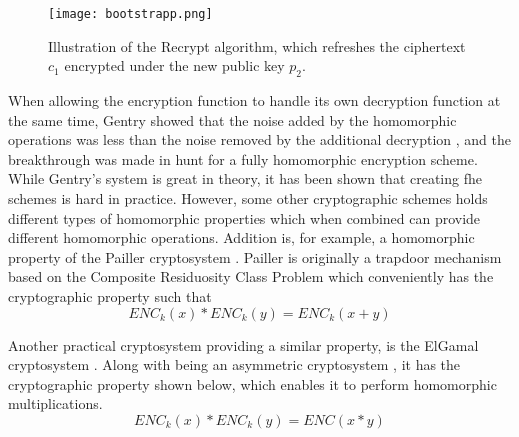 \begin{figure}[h]
	\centering
	\texttt{[image: bootstrapp.png]}
	\caption{Illustration of the Recrypt algorithm, which refreshes the ciphertext $c_1$ encrypted under the new public key $p_2$.}
	\label{recrypt_function}
\end{figure}



When allowing the encryption function to handle its own decryption function at the same time, Gentry showed that the noise added by the homomorphic operations was less than the noise removed by the additional decryption \cite{Gentry_computing_arb_func_enc_data}, and the breakthrough was made in hunt for a fully homomorphic encryption scheme. While Gentry's system is great in theory, it has been shown that creating \gls{fhe} schemes is hard in practice. However, some other cryptographic schemes holds different types of homomorphic properties which when combined can provide different homomorphic operations. Addition is, for example, a homomorphic property of the Pailler cryptosystem \citep{Paillier}. Pailler is originally a trapdoor mechanism based on the Composite Residuosity Class Problem which conveniently has the cryptographic property such that \[ENC_k(x) * ENC_k(y) = ENC_k(x + y)\]

Another practical cryptosystem providing a similar property, is the ElGamal cryptosystem \cite{elgamal}. Along with being an asymmetric cryptosystem , it has the cryptographic property shown below, which enables it to perform homomorphic multiplications.  \[ENC_k(x) * ENC_k(y) = ENC(x * y)\]


